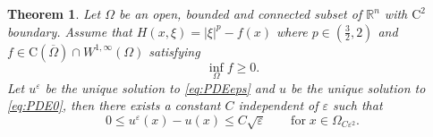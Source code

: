 \documentclass[11pt,reqno]{amsart}
\numberwithin{figure}{section}
\theoremstyle{plain}
\newtheorem{thm}{Theorem}[section]
\theoremstyle{remark}
\numberwithin{equation}{section}
\newcommand{\R}{\mathbb{R}}
\begin{document}
\begin{thm}\label{thm:rate_doubling0} Let $\Omega$ be an open, bounded and connected subset of $\R^n$ with $\mathrm{C}^2$ boundary. Assume that $H(x,\xi) = |\xi|^p - f(x)$ where $p\in\left(\frac{3}{2},2\right)$ and $f\in \mathrm{C}(\overline{\Omega})\cap W^{1,\infty}(\Omega)$ satisfying
\begin{equation*}
    \inf_{\Omega} f \geq 0.
\end{equation*}
Let $u^\varepsilon$ be the unique solution to \eqref{eq:PDEeps} and $u$ be the unique solution to \eqref{eq:PDE0}, then there exists a constant $C$ independent of $\varepsilon$ such that
\begin{equation*}
    0\leq u^\varepsilon(x) - u(x) \leq C\sqrt{\varepsilon} \qquad\text{for}\;x\in \Omega_{C\varepsilon^2}.
\end{equation*}
\end{thm}
\end{document}
